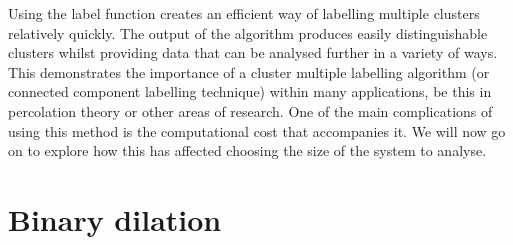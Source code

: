 Using the label function creates an efficient way of labelling multiple clusters relatively quickly.
The output of the algorithm produces easily distinguishable clusters whilst providing data that can be analysed further in a variety of ways. 
This demonstrates the importance of a cluster multiple labelling algorithm (or connected component labelling technique) within many applications, 
be this in percolation theory or other areas of research. 
One of the main complications of using this method is the computational cost that accompanies it. 
We will now go on to explore how this has affected choosing the size of the system to analyse.



\newpage

\section{Binary dilation}
\label{sec:a-binary-dialator}

